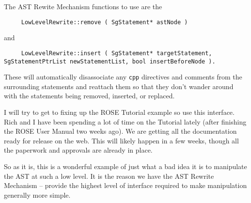\begin{enumerate}
The AST Rewite Mechanism functions to use are the 
{\indent
{\mySmallFontSize
\begin{verbatim}
     LowLevelRewrite::remove ( SgStatement* astNode )
\end{verbatim}
}}
and 
{\indent
{\mySmallFontSize
\begin{verbatim}
     LowLevelRewrite::insert ( SgStatement* targetStatement, SgStatementPtrList newStatementList, bool insertBeforeNode ).
\end{verbatim}
}}

These will automatically disassociate any {\tt cpp} directives and comments
from the surrounding statements and reattach them so that they don't
wander around with the statements being removed, inserted, or replaced.

I will try to get to fixing up the ROSE Tutorial example so use this
interface.  Rich and I have been spending a lot of time on the Tutorial 
lately (after finishing the ROSE User Manual two weeks ago).  We are getting
all the documentation ready for release on the web.  This will likely 
happen in a few weeks, though all the paperwork and approvals are already
in place.

So as it is, this is a wonderful example of just what a bad idea it is
to manipulate the AST at such a low level.
It is the reason we have the AST Rewrite Mechanism -- provide the highest level
of interface required to make manipulation generally more simple.


\end{enumerate}
